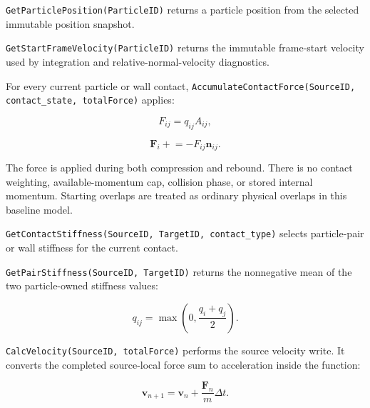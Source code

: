 
\texttt{GetParticlePosition(ParticleID)} returns a particle position from the
selected immutable position snapshot.


\texttt{GetStartFrameVelocity(ParticleID)} returns the immutable frame-start
velocity used by integration and relative-normal-velocity diagnostics.


For every current particle or wall contact,
\texttt{AccumulateContactForce(SourceID, contact\_state, totalForce)} applies:

\begin{equation}
F_{ij}=q_{ij}A_{ij},
\end{equation}

\begin{equation}
\mathbf F_i \mathrel{+}= -F_{ij}\mathbf n_{ij}.
\end{equation}

The force is applied during both compression and rebound.  There is no
contact weighting, available-momentum cap, collision phase, or stored
internal momentum.  Starting overlaps are treated as ordinary physical
overlaps in this baseline model.


\texttt{GetContactStiffness(SourceID, TargetID, contact\_type)} selects
particle-pair or wall stiffness for the current contact.


\texttt{GetPairStiffness(SourceID, TargetID)} returns the nonnegative mean of
the two particle-owned stiffness values:

\begin{equation}
q_{ij}=\max\left(0,\frac{q_i+q_j}{2}\right).
\end{equation}


\texttt{CalcVelocity(SourceID, totalForce)} performs the source velocity
write.  It converts the completed source-local force sum to acceleration
inside the function:

\begin{equation}
\mathbf v_{n+1}
=
\mathbf v_n+\frac{\mathbf F_n}{m}\Delta t.
\end{equation}


